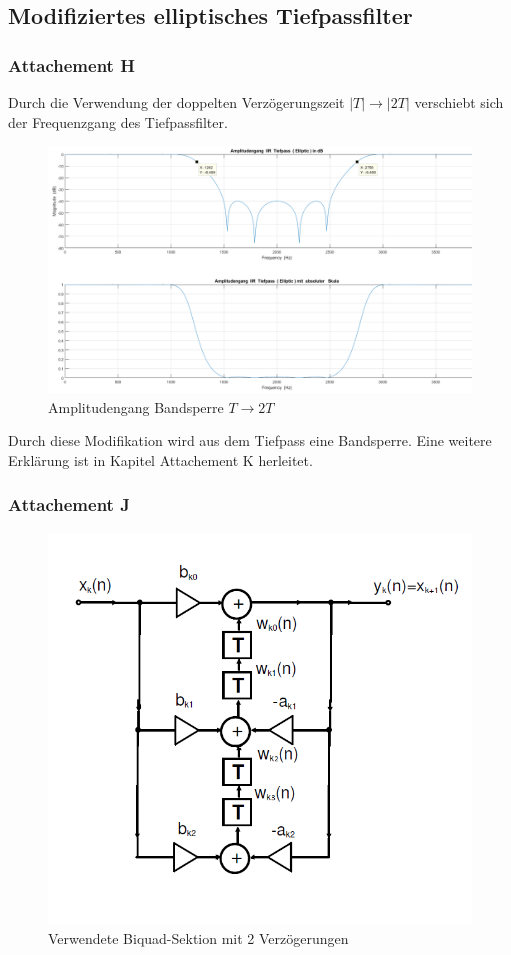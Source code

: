 \clearpage

\subsection{Modifiziertes elliptisches Tiefpassfilter}
\subsubsection{Attachement H}
\noindent Durch die Verwendung der doppelten Verzögerungszeit $|T| \rightarrow |2T|$ verschiebt sich der Frequenzgang des Tiefpassfilter.

\begin{figure}[h]
\centering
\includegraphics[width=0.7\linewidth]{./Bilder/Attachment_H_ELLIP_STOP}
\caption{Amplitudengang Bandsperre $T \rightarrow 2T$}
\label{fig:Attachment_H_ELLIP_STOP}
\end{figure}

\noindent Durch diese Modifikation wird aus dem Tiefpass eine Bandsperre. Eine weitere Erklärung ist in Kapitel Attachement K herleitet.



\subsubsection{Attachement J}

\begin{figure}[h]
\centering
\includegraphics[width=0.7\linewidth]{Bilder/Biquad2T}
\caption{Verwendete Biquad-Sektion mit 2 Verzögerungen}
\label{fig:Biquad2T}
\end{figure}

